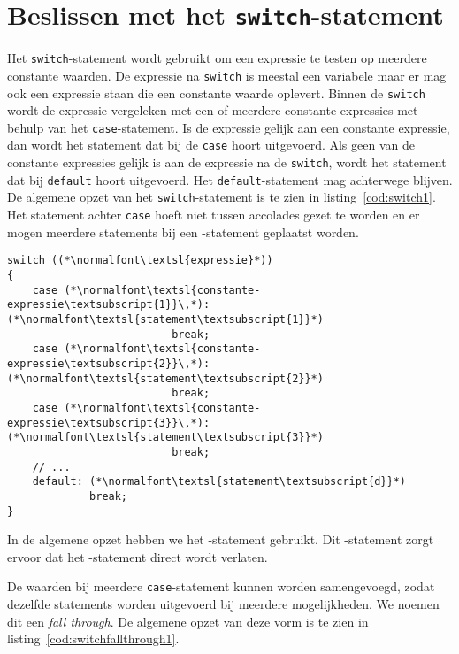 

\section{Beslissen met het \texttt{switch}-statement}
Het \texttt{switch}-statement wordt gebruikt om een expressie te testen op meerdere constante waarden. De expressie na \texttt{switch} is meestal een variabele maar er mag ook een expressie staan die een constante waarde oplevert. Binnen de \texttt{switch} wordt de expressie vergeleken met een of meerdere constante expressies met behulp van het \texttt{case}-statement. Is de expressie gelijk aan een constante expressie, dan wordt het statement dat bij de \texttt{case} hoort uitgevoerd. Als geen van de constante expressies gelijk is aan de expressie na de \texttt{switch}, wordt het statement dat bij \texttt{default} hoort uitgevoerd. Het \texttt{default}-statement mag achterwege blijven. De algemene opzet van het \texttt{switch}-statement is te zien in listing~\ref{cod:switch1}. Het statement achter \texttt{case} hoeft niet tussen accolades gezet te worden en er mogen meerdere statements bij een -statement geplaatst worden.

\begin{lstlisting}[caption=Opzet van het \texttt{switch}-statment.,label=cod:switch1]
switch ((*\normalfont\textsl{expressie}*))
{
    case (*\normalfont\textsl{constante-expressie\textsubscript{1}}\,*): (*\normalfont\textsl{statement\textsubscript{1}}*)
                          break;
    case (*\normalfont\textsl{constante-expressie\textsubscript{2}}\,*): (*\normalfont\textsl{statement\textsubscript{2}}*)
                          break;
    case (*\normalfont\textsl{constante-expressie\textsubscript{3}}\,*): (*\normalfont\textsl{statement\textsubscript{3}}*)
                          break;
    // ...
    default: (*\normalfont\textsl{statement\textsubscript{d}}*)
             break;
}
\end{lstlisting}

In de algemene opzet hebben we het -statement gebruikt. Dit -statement zorgt ervoor dat het -statement direct wordt verlaten. 

De waarden bij meerdere \texttt{case}-statement kunnen worden samengevoegd, zodat dezelfde statements worden uitgevoerd bij meerdere mogelijkheden. We noemen dit een \textsl{fall through}. De algemene opzet van deze vorm is te zien in listing~\ref{cod:switchfallthrough1}. 

